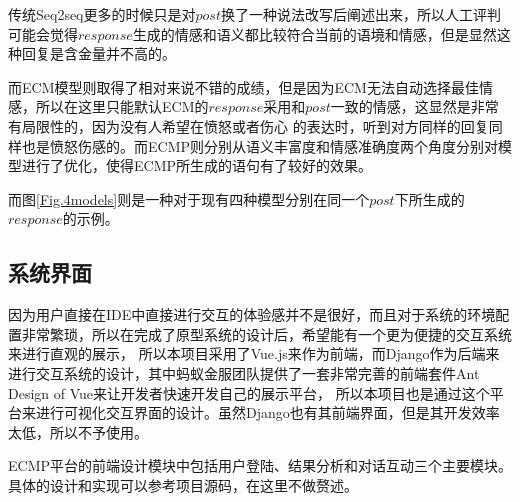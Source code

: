 \documentclass[supercite]{HustGraduPaper}
\theoremstyle{definition}
\begin{document}
传统Seq2seq更多的时候只是对$post$换了一种说法改写后阐述出来，所以人工评判可能会觉得$response$生成的情感和语义都比较符合当前的语境和情感，但是显然这种回复是含金量并不高的。

而ECM模型则取得了相对来说不错的成绩，但是因为ECM无法自动选择最佳情感，所以在这里只能默认ECM的$response$采用和$post$一致的情感，这显然是非常有局限性的，因为没有人希望在愤怒或者伤心
的表达时，听到对方同样的回复同样也是愤怒伤感的。而ECMP则分别从语义丰富度和情感准确度两个角度分别对模型进行了优化，使得ECMP所生成的语句有了较好的效果。

而图\ref{Fig.4models}则是一种对于现有四种模型分别在同一个$post$下所生成的$response$的示例。

\subsection{系统界面}
因为用户直接在IDE中直接进行交互的体验感并不是很好，而且对于系统的环境配置非常繁琐，所以在完成了原型系统的设计后，希望能有一个更为便捷的交互系统来进行直观的展示，
所以本项目采用了Vue.js来作为前端，而Django作为后端来进行交互系统的设计，其中蚂蚁金服团队提供了一套非常完善的前端套件Ant Design of Vue来让开发者快速开发自己的展示平台，
所以本项目也是通过这个平台来进行可视化交互界面的设计。虽然Django也有其前端界面，但是其开发效率太低，所以不予使用。

ECMP平台的前端设计模块中包括用户登陆、结果分析和对话互动三个主要模块。具体的设计和实现可以参考项目源码\cite{ECMP}，在这里不做赘述。
\end{document}
